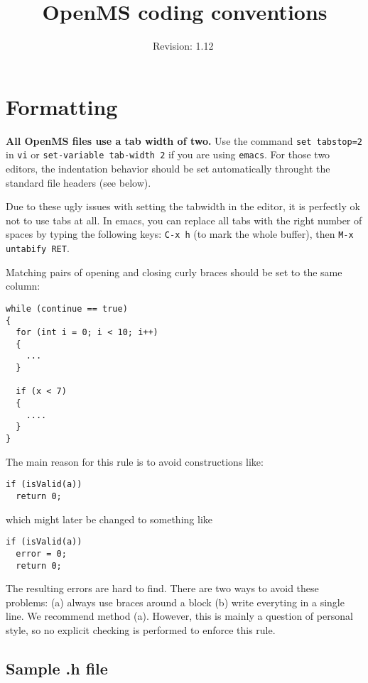 \documentclass[a4]{article}
\title{OpenMS coding conventions}
\author{}
\date{$ $Revision: 1.12 $ $}
\begin{document}
\maketitle

\section{Formatting}

{\bf All OpenMS files use a tab width of two.} Use the command {\tt set tabstop=2} in
{\tt vi} or {\tt set-variable tab-width 2} if you are using {\tt emacs}. For
those two editors, the indentation behavior should be set automatically
throught the standard file headers (see below).

Due to these ugly issues with setting the tabwidth in the editor, it is
perfectly ok not to use tabs at all.  In emacs, you can replace all tabs with
the right number of spaces by typing the following keys: \texttt{C-x h} (to
mark the whole buffer), then \texttt{M-x untabify RET}.

Matching pairs of opening and closing curly braces should be set to the same
column:
\begin{verbatim}
while (continue == true)
{
  for (int i = 0; i < 10; i++)
  {
    ...
  }

  if (x < 7)
  {
    ....
  }
}
\end{verbatim}
The main reason for this rule is to avoid constructions like:

\begin{verbatim}
if (isValid(a))
  return 0;
\end{verbatim}

which might later be changed to something like

\begin{verbatim}
if (isValid(a))
  error = 0;
  return 0;
\end{verbatim}

The resulting errors are hard to find. There are two ways to avoid these
problems: (a) always use braces around a block (b) write everyting in a single
line. We recommend method (a).
However, this is mainly a question of personal style, so no explicit checking
is performed to enforce this rule.

\subsection{Sample .h file}
\end{document}

